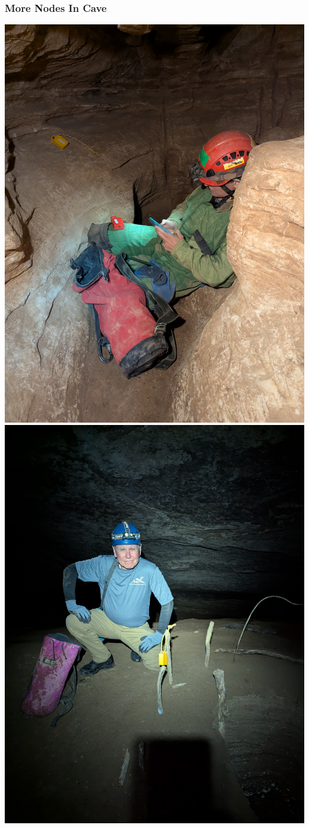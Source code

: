 \documentclass{beamer}
\begin{document}
\begin{frame}
\frametitle{More Nodes In Cave}

\begin{center}
\includegraphics[width=.47\textwidth]{../images/PXL_20250425_170556534.jpg}\hfill
\includegraphics[width=.47\textwidth]{../images/PXL_20250610_223342846.jpg}
\end{center}

\end{frame}
\end{document}
